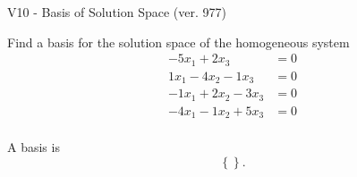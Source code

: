 \begin{exercise}
  \begin{exerciseTitle}V10 - Basis of Solution Space (ver. 977)\end{exerciseTitle}
  \begin{exerciseStatement}
    Find a basis for the solution space of the homogeneous system 
\begin{align*}
 -5 x_ 1 + 2 x_ 3 &= 0  \\ 
  1 x_ 1 -4 x_ 2 -1 x_ 3 &= 0  \\ 
  -1 x_ 1 + 2 x_ 2 -3 x_ 3 &= 0  \\ 
  -4 x_ 1 -1 x_ 2 + 5 x_ 3 &= 0  \\ 
 \end{align*}


 
  \end{exerciseStatement}

  \begin{exerciseAnswer}
   A basis is   
\[\left\{\right\}.\]

  


  \end{exerciseAnswer}
\end{exercise}